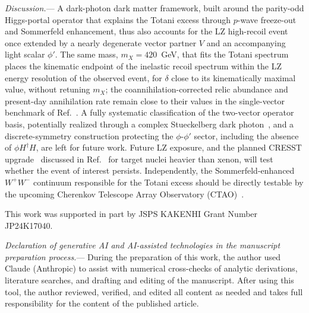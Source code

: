 \documentclass[aps,prl,twocolumn,superscriptaddress,nofootinbib]{revtex4-2}
\begin{document}
\textit{Discussion.}---%
A dark-photon dark matter framework, built around the parity-odd
Higgs-portal operator that explains the Totani excess through $p$-wave
freeze-out and Sommerfeld enhancement, thus also accounts for the LZ
high-recoil event once extended by a nearly degenerate vector
partner $V$ and an accompanying light scalar $\phi'$. The same mass,
$m_X=420$~GeV, that fits the Totani
spectrum places the kinematic endpoint of the inelastic recoil spectrum
within the LZ energy resolution of the observed event, for $\delta$
close to its kinematically maximal value, without retuning $m_X$; the
coannihilation-corrected relic abundance and present-day annihilation
rate remain close to their values in the single-vector benchmark of
Ref.~\cite{Yamashita2026}. A fully systematic classification of the
two-vector operator basis, potentially realized through a complex
Stueckelberg dark photon~\cite{Bertuzzo2024}, and a discrete-symmetry
construction protecting the $\phi$-$\phi'$ sector, including the
absence of $\phi H^\dagger H$, are
left for future work.
Future LZ exposure, and
the planned CRESST upgrade~\cite{Angloher2026} discussed in
Ref.~\cite{Su2026} for target nuclei heavier than xenon,
will test whether the event of interest persists. Independently, the
Sommerfeld-enhanced $W^+W^-$ continuum responsible for the Totani
excess should be directly testable by the upcoming Cherenkov Telescope
Array Observatory (CTAO)~\cite{Pierre2014}.

\begin{acknowledgments}
This work was supported in part by JSPS KAKENHI Grant Number
JP24K17040.
\end{acknowledgments}

\textit{Declaration of generative AI and AI-assisted technologies in
the manuscript preparation process.}---%
During the preparation of this work, the author used Claude
(Anthropic) to assist with numerical cross-checks of analytic
derivations, literature searches, and drafting and editing of the
manuscript. After using this tool, the author reviewed, verified, and
edited all content as needed and takes full responsibility for the
content of the published article.
\end{document}
